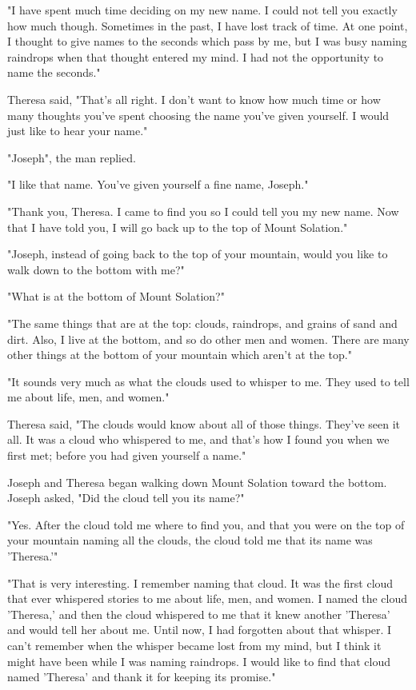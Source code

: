 "I have spent much time deciding on my new name. I could not tell you exactly how much though. Sometimes in the past, I have lost track of time. At one point, I thought to give names to the seconds which pass by me, but I was busy naming raindrops when that thought entered my mind. I had not the opportunity to name the seconds."

Theresa said, "That's all right. I don't want to know how much time or how many thoughts you've spent choosing the name you've given yourself. I would just like to hear your name."

"Joseph", the man replied.

"I like that name. You've given yourself a fine name, Joseph."

"Thank you, Theresa. I came to find you so I could tell you my new name. Now that I have told you, I will go back up to the top of Mount Solation."

"Joseph, instead of going back to the top of your mountain, would you like to walk down to the bottom with me?"

"What is at the bottom of Mount Solation?"

"The same things that are at the top: clouds, raindrops, and grains of sand and dirt. Also, I live at the bottom, and so do other men and women. There are many other things at the bottom of your mountain which aren't at the top."

"It sounds very much as what the clouds used to whisper to me. They used to tell me about life, men, and women."

Theresa said, "The clouds would know about all of those things. They've seen it all. It was a cloud who whispered to me, and that's how I found you when we first met; before you had given yourself a name."

Joseph and Theresa began walking down Mount Solation toward the bottom. Joseph asked, "Did the cloud tell you its name?"

"Yes. After the cloud told me where to find you, and that you were on the top of your mountain naming all the clouds, the cloud told me that its name was 'Theresa.'"

"That is very interesting. I remember naming that cloud. It was the first cloud that ever whispered stories to me about life, men, and women. I named the cloud 'Theresa,' and then the cloud whispered to me that it knew another 'Theresa' and would tell her about me. Until now, I had forgotten about that whisper. I can't remember when the whisper became lost from my mind, but I think it might have been while I was naming raindrops. I would like to find that cloud named 'Theresa' and thank it for keeping its promise."


